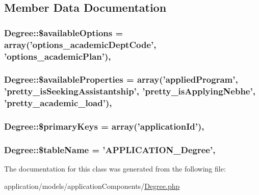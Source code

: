 \subsection{Member Data Documentation}
\hypertarget{class_degree_a565c2be7ed24262f732fb04cdb114ce2}{
\subsubsection[{\$available\-Options}]{\setlength{\rightskip}{0pt plus 5cm}Degree\-::\$available\-Options = array('options\-\_\-academic\-Dept\-Code', 'options\-\_\-academic\-Plan')\hspace{0.3cm}{\ttfamily [static]}, {\ttfamily [protected]}}}\label{class_degree_a565c2be7ed24262f732fb04cdb114ce2}
\hypertarget{class_degree_afb989882a36e830c21e867bc4a65f9fc}{
\subsubsection[{\$available\-Properties}]{\setlength{\rightskip}{0pt plus 5cm}Degree\-::\$available\-Properties = array('applied\-Program', 'pretty\-\_\-is\-Seeking\-Assistantship', 'pretty\-\_\-is\-Applying\-Nebhe', 'pretty\-\_\-academic\-\_\-load')\hspace{0.3cm}{\ttfamily [static]}, {\ttfamily [protected]}}}\label{class_degree_afb989882a36e830c21e867bc4a65f9fc}
\hypertarget{class_degree_a81827ba2c94da59780aef2a3f713f065}{
\subsubsection[{\$primary\-Keys}]{\setlength{\rightskip}{0pt plus 5cm}Degree\-::\$primary\-Keys = array('application\-Id')\hspace{0.3cm}{\ttfamily [static]}, {\ttfamily [protected]}}}\label{class_degree_a81827ba2c94da59780aef2a3f713f065}
\hypertarget{class_degree_a0b4cb9c53a0caf30457996db3ff090d0}{
\subsubsection[{\$table\-Name}]{\setlength{\rightskip}{0pt plus 5cm}Degree\-::\$table\-Name = 'A\-P\-P\-L\-I\-C\-A\-T\-I\-O\-N\-\_\-\-Degree'\hspace{0.3cm}{\ttfamily [static]}, {\ttfamily [protected]}}}\label{class_degree_a0b4cb9c53a0caf30457996db3ff090d0}


The documentation for this class was generated from the following file\-:\begin{DoxyCompactItemize}
\item 
application/models/application\-Components/\hyperlink{_degree_8php}{Degree.\-php}\end{DoxyCompactItemize}
